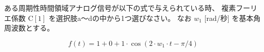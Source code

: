 ある周期性時間領域アナログ信号が以下の式で与えられている時、
複素フーリエ係数 $\textrm{C}[1]$ を選択肢a〜dの中から1つ選びなさい。
なお $w_1$ [rad/秒] を基本角周波数とする。

\[
f(t) = 
1
+ 0
+ 1 \cdot \cos( 2 \cdot w_1 \cdot t - \pi/4 )
\]
